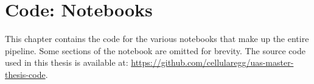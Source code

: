 \documentclass[Master,english,IEEE]{twbook}
\begin{document}
\pagebreak
\chapter{Code: Notebooks}
This chapter contains the code for the various notebooks that make up the entire pipeline. Some sections of the notebook are omitted for brevity. The source code used in this thesis is available at: \url{https://github.com/cellularegg/uas-master-thesis-code}.












\clearpage
\end{document}
